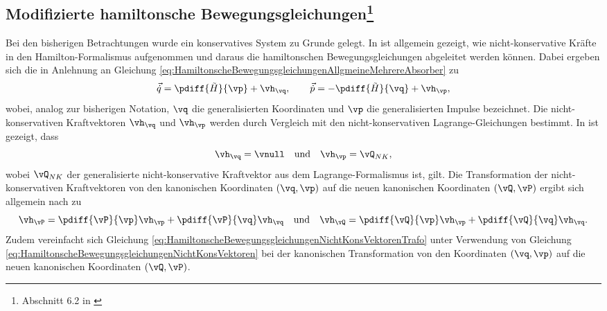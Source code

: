 \subsection[Modifizierte hamiltonsche Bewegungsgleichungen]
			{Modifizierte hamiltonsche Bewegungsgleichungen\footnote{Abschnitt 6.2 in \cite{Mayet:Tautochronic}}} 
\label{subsec:TautDesignNichtKonKrafte}
%
%
%
Bei den bisherigen Betrachtungen wurde ein konservatives System zu Grunde gelegt.
In \cite{Tveter:1994:HamiltonModified, tveter:1998:DerivingTheHamilton} ist allgemein gezeigt, 
wie nicht-konservative Kräfte in den Hamilton-Formalismus aufgenommen und daraus die hamiltonschen Bewegungsgleichungen abgeleitet werden können.
Dabei ergeben sich die  in Anlehnung 
an Gleichung	\eqref{eq:HamiltonscheBewegungsgleichungenAllgmeineMehrereAbsorber}  zu
%
%
\begin{equation}
	\vec{\dot{q}} = \pdiff{\tilde{H}}{{\vp}} + \vh_{\vq}, 					\qquad \vec{\dot{p}} = - \pdiff{\tilde{H}}{{\vq}} + \vh_{\vp},
	\label{eq:HamiltonscheBewegungsgleichungenModifiziert}
\end{equation}
wobei, analog zur bisherigen Notation,  $\vq$ die generalisierten Koordinaten und $\vp$ die generalisierten Impulse bezeichnet.
Die nicht-konservativen Kraftvektoren $\vh_{\vq}$ und $\vh_{\vp}$ werden  durch Vergleich 
mit den nicht-konservativen Lagrange-Gleichungen bestimmt.
In \cite{Mayet:Tautochronic} ist gezeigt, dass
%
%
% 
\begin{equation}
	\vh_{\vq} = \vnull 					\quad \text{und} \quad 		\vh_{\vp} = \vQ_{NK},
	\label{eq:HamiltonscheBewegungsgleichungenNichtKonsVektoren}
\end{equation}
wobei $\vQ_{NK}$ der generalisierte nicht-konservative Kraftvektor aus dem Lagrange-Formalismus ist, gilt.
Die Transformation der nicht-konservativen Kraftvektoren von den kanonischen Koordinaten $(\vq, \vp)$ 
auf die neuen kanonischen Koordinaten $(\vQ, \vP)$ ergibt sich allgemein nach  \cite{Mayet:Tautochronic} zu
\begin{equation}
	\vh_{\vP} = \pdiff{\vP}{{\vp}} \vh_{\vp} + \pdiff{\vP}{{\vq}} \vh_{\vq} 					
		\quad \text{und} \quad  
	\vh_{\vQ} = \pdiff{\vQ}{{\vp}} \vh_{\vp} + \pdiff{\vQ}{{\vq}} \vh_{\vq}.
	\label{eq:HamiltonscheBewegungsgleichungenNichtKonsVektorenTrafo}
\end{equation}
Zudem vereinfacht sich  Gleichung \eqref{eq:HamiltonscheBewegungsgleichungenNichtKonsVektorenTrafo} 
unter Verwendung von Gleichung	\eqref{eq:HamiltonscheBewegungsgleichungenNichtKonsVektoren} bei 
der kanonischen Transformation von den Koordinaten $(\vq, \vp)$
auf die neuen kanonischen Koordinaten $(\vQ, \vP)$.




